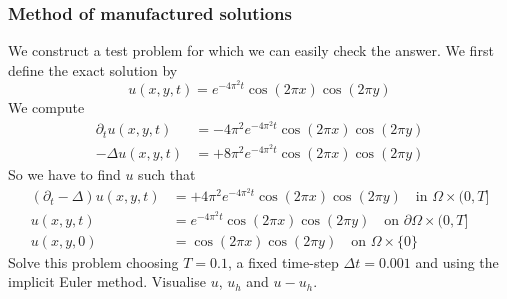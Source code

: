 \begin{frame}
    \frametitle{Method of manufactured solutions}
    We construct a test problem for which we can easily check the
    answer. We first define the exact solution by
    \begin{equation*}
        u(x,y,t) = e^{-4\pi^2 t}\cos(2\pi x)\cos(2 \pi y)
    \end{equation*}
    We compute
    \begin{align*}
        \partial_t u(x,y,t) &=  -4\pi^2 e^{-4\pi^2 t}\cos(2\pi
        x)\cos(2 \pi y) 
        \\
           -\Delta u(x,y,t) &=  +8\pi^2 e^{-4\pi^2 t}\cos(2\pi
        x)\cos(2 \pi y)
    \end{align*}
    So we have to find $u$ such that
    \begin{align*}
        (\partial_t -\Delta) u(x,y,t)  &=  +4\pi^2 e^{-4\pi^2 t}\cos(2\pi x)\cos(2 \pi y) 
    \quad \text{in } \Omega \times (0,T]
        \\
        u(x,y,t) &= e^{-4\pi^2 t}\cos(2\pi x)\cos(2 \pi y)
        \quad \text{on } \partial \Omega \times (0,T]
        \\
        u(x,y,0) &= \cos(2\pi x)\cos(2 \pi y) 
        \quad \text{on } \Omega \times \{0\}
    \end{align*}
     Solve this problem choosing $T=0.1$, a fixed
    time-step $\Delta t = 0.001$ and using the implicit Euler method.
    Visualise $u$, $u_h$ and $u - u_h$.
\end{frame}

